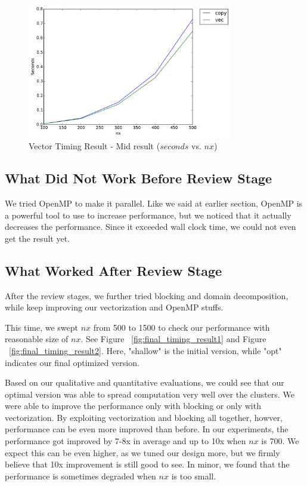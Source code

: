 \begin{figure}[h]
    \centering
    \includegraphics[width=0.8\textwidth]{figs/vec-timing2.pdf}
    \caption{Vector Timing Result - Mid result  ($seconds$ vs. $nx$)}
    \label{fig:vector_timing_result2}
\end{figure}

\subsection{What Did Not Work Before Review Stage}
We tried OpenMP to make it parallel. Like we said at earlier section, OpenMP is a powerful tool to use to increase performance, but we noticed that it actually decreases the performance. Since it exceeded wall clock time, we could not even get the result yet.

\subsection{What Worked After Review Stage}
After the review stages, we further tried blocking and domain decomposition, while keep improving our vectorization and OpenMP stuffs.

This time, we swept $ nx $ from 500 to 1500 to check our performance with reasonable size of $ nx $. See
Figure ~\ref{fig:final_timing_result1} and Figure ~\ref{fig:final_timing_result2}. Here, "shallow" is the initial version, while "opt" indicates our final optimized version. 

Based on our qualitative and quantitative evaluations, we could see that our
optimal version was able to spread computation very well over the clusters. We were able to improve the performance only with blocking or only with vectorization. By exploiting vectorization and blocking all together, howver, performance can be even more improved than before. In our experiments, the performance got improved by 7-8x in average and up to 10x when $ nx $ is 700. We expect this can be even higher, as we tuned our design more, but we firmly believe that 10x improvement is still good to see. In minor, we found that the performance is sometimes degraded when $ nx $ is too small.  


